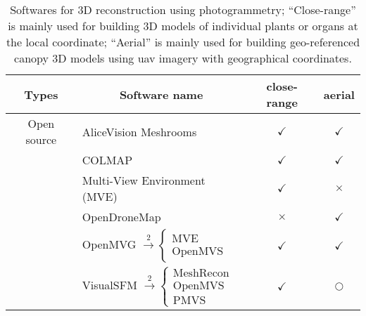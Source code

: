 \begin{table}[htb]
  \caption[Softwares for 3D reconstruction using photogrammetry]{Softwares for 3D reconstruction using photogrammetry; ``Close-range'' is mainly used for building 3D models of individual plants or organs at the local coordinate; ``Aerial'' is mainly used for building geo-referenced canopy 3D models using \gls{uav} imagery with geographical coordinates.}
  \label{tbl:int1}
    \begin{center}
      \begin{threeparttable}
      \begin{tabular*}{\linewidth}{@{\extracolsep{\fill}} clcc}
        \hline
        \multicolumn{1}{c}{\textbf{Types}} & \multicolumn{1}{c}{\textbf{Software name}}                                                                      & \textbf{close-range} & \textbf{aerial}     \\ \hline
        Open source                        & AliceVision Meshrooms                                                                                           & $\checkmark$         & $\checkmark$        \\
                                           & COLMAP                                                                                                          & $\checkmark$         & $\checkmark$        \\
                                           & Multi-View Environment (MVE)                                                                                    & $\checkmark$         & $\times$            \\
                                           & OpenDroneMap\tnote{1}                                                                                           & $\times$             & $\checkmark$        \\
                                           & OpenMVG $\stackrel{2}{\rightarrow} \begin{cases} \text{MVE} \\ \text{OpenMVS} \end{cases}$                      & $\checkmark$         & $\checkmark$        \\
                                           & VisualSFM $\stackrel{2}{\rightarrow} \begin{cases}\text{MeshRecon}\\ \text{OpenMVS} \\ \text{PMVS} \end{cases}$ & $\checkmark$         & $\bigcirc$\tnote{3} \\

\end{tabular*}
\end{threeparttable}
\end{center}
\end{table}
